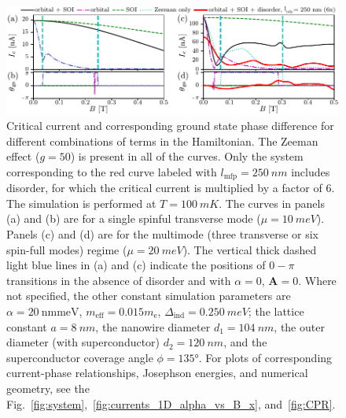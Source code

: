 \begin{figure}
\begin{center}
\includegraphics[width=\columnwidth]{chapter_supercurrent/figures/fig4.pdf}
\caption{Critical current and corresponding ground state phase difference for different combinations of terms in the Hamiltonian.
The Zeeman effect ($g=50$) is present in all of the curves.
Only the system corresponding to the red curve labeled with $l_\textrm{mfp}=\SI{250}{nm}$ includes disorder, for which the critical current is multiplied by a factor of 6.
The simulation is performed at $T=\SI{100}{mK}$.
The curves in panels (a) and (b) are for a single spinful transverse mode ($\mu=\SI{10}{meV}$).
Panels (c) and (d) are for the multimode (three transverse or six spin-full modes) regime ($\mu=\SI{20}{meV}$).
The vertical thick dashed light blue lines in (a) and (c) indicate the positions of $0-\pi$ transitions in the absence of disorder and with $\alpha = 0$, $\mathbf{A}=0$.
Where not specified, the other constant simulation parameters are $\alpha=\SI{20}{\nm \meV}$, $m_\textrm{eff}=0.015 m_\textrm{e}$, $\Delta_\textrm{ind}=\SI{0.250}{meV}$; the lattice constant $a=\SI{8}{nm}$, the nanowire diameter $d_1=\SI{104}{nm}$, the outer diameter (with superconductor) $d_2=\SI{120}{nm}$, and the superconductor coverage angle $\phi=135\si{\degree}$.
For plots of corresponding current-phase relationships, Josephson energies, and numerical geometry, see the Fig.~\ref{fig:system},~\ref{fig:currents_1D_alpha_vs_B_x}, and~\ref{fig:CPR}.
}
\label{fig:critical_currents}
\end{center}
\end{figure}


